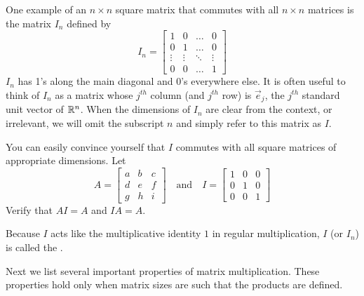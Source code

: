 \documentclass{ximera}
\begin{document}
One example of an $n\times n$ square matrix that commutes with all $n\times n$ matrices is the matrix $I_n$ defined by
$$I_n=\begin{bmatrix}1&0&\ldots &0\\0&1&\ldots &0\\\vdots &\vdots &\ddots &\vdots \\0 &0 &\ldots & 1\end{bmatrix}$$
$I_n$ has 1's along the main diagonal and 0's everywhere else.  It is often useful to think of $I_n$ as a matrix whose $j^{th}$ column (and $j^{th}$ row) is $\vec{e}_j$, the $j^{th}$ standard unit vector of $\mathbb{R}^n$.  When the dimensions of $I_n$ are clear from the context, or irrelevant, we will omit the subscript $n$ and simply refer to this matrix as $I$.

You can easily convince yourself that $I$ commutes with all square matrices of appropriate dimensions.  Let $$A=\begin{bmatrix}a&b&c\\d&e&f\\g&h&i\end{bmatrix}\quad\text{and}\quad I=\begin{bmatrix}1&0&0\\0&1&0\\0&0&1\end{bmatrix}$$
Verify that $AI=A$ and $IA=A$.  

Because $I$ acts like the multiplicative identity $1$ in regular multiplication, $I$ (or $I_n$) is called the .

Next we list several important properties of matrix multiplication. These properties hold only when matrix sizes are such that the products are defined. 
\end{document}
